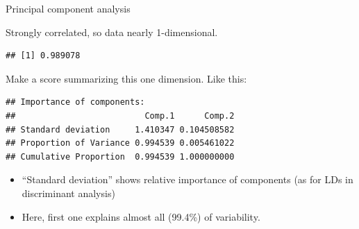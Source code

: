 \begin{frame}[fragile]{Principal component analysis}

Strongly correlated, so data nearly 1-dimensional. 

\begin{knitrout}
\color{fgcolor}\begin{kframe}
\begin{alltt}
\end{alltt}
\begin{verbatim}
## [1] 0.989078
\end{verbatim}
\end{kframe}
\end{knitrout}

Make a score summarizing this one dimension. Like this:

\begin{knitrout}\small
{}\color{fgcolor}\begin{kframe}
\begin{alltt}
\hlkwb{=}\hlstd{(test12[,}\hlopt{:}\hlstd{],}
\end{alltt}
\begin{verbatim}
## Importance of components:
##                          Comp.1      Comp.2
## Standard deviation     1.410347 0.104508582
## Proportion of Variance 0.994539 0.005461022
## Cumulative Proportion  0.994539 1.000000000
\end{verbatim}
\end{kframe}
\end{knitrout}

\begin{itemize}
\item ``Standard deviation'' shows relative importance of components
  (as for LDs in discriminant analysis)
\item Here, first one explains almost all (99.4\%) of variability.
\end{itemize}
  
\end{frame}

